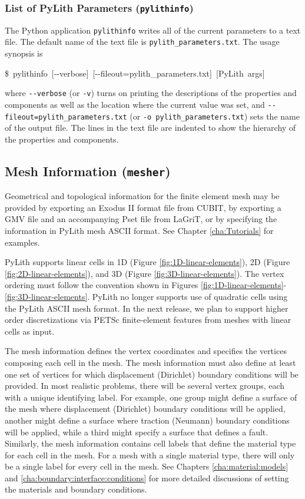 \subsubsection{List of PyLith Parameters (\texttt{pylithinfo})}

The Python application \texttt{pylithinfo} writes all of the current
parameters to a text file. The default name of the text file is \texttt{pylith\_parameters.txt}.
The usage synopsis is
\begin{lyxcode}
\$~pylithinfo~{[}-{}-verbose{]}~{[}-{}-fileout=pylith\_parameters.txt{]}~{[}PyLith~args{]}
\end{lyxcode}
where \texttt{-{}-verbose} (or \texttt{-v}) turns on printing the
descriptions of the properties and components as well as the location
where the current value was set, and \texttt{-{}-fileout=pylith\_parameters.txt}
(or \texttt{-o pylith\_parameters.txt}) sets the name of the output
file. The lines in the text file are indented to show the hierarchy
of the properties and components. 


\subsection{Mesh Information (\texttt{mesher})}

Geometrical and topological information for the finite element mesh
may be provided by exporting an Exodus II format file from CUBIT,
by exporting a GMV file and an accompanying Pset file from LaGriT,
or by specifying the information in PyLith mesh ASCII format. See
Chapter \ref{cha:Tutorials} for examples.

PyLith supports linear cells in 1D (Figure \ref{fig:1D-linear-elements}),
2D (Figure \ref{fig:2D-linear-elements}), and 3D (Figure \ref{fig:3D-linear-elements}).
The vertex ordering must follow the convention shown in Figures \ref{fig:1D-linear-elements}-\ref{fig:3D-linear-elements}.
PyLith no longer supports use of quadratic cells using the PyLith
ASCII mesh format. In the next release, we plan to support higher
order discretizations via PETSc finite-element features from meshes
with linear cells as input.

The mesh information defines the vertex coordinates and specifies
the vertices composing each cell in the mesh. The mesh information
must also define at least one set of vertices for which displacement
(Dirichlet) boundary conditions will be provided. In most realistic
problems, there will be several vertex groups, each with a unique
identifying label. For example, one group might define a surface of
the mesh where displacement (Dirichlet) boundary conditions will be
applied, another might define a surface where traction (Neumann) boundary
conditions will be applied, while a third might specify a surface
that defines a fault. Similarly, the mesh information contains cell
labels that define the material type for each cell in the mesh. For
a mesh with a single material type, there will only be a single label
for every cell in the mesh. See Chapters \ref{cha:material:models}
and \ref{cha:boundary:interface:conditions} for more detailed discussions
of setting the materials and boundary conditions.

